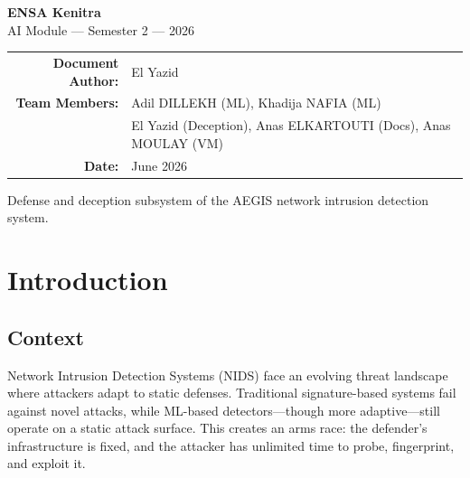 \documentclass[12pt,a4paper]{article}
\begin{document}
\begin{titlepage}
\centering
\vspace*{2cm}
\vspace{2cm}
{\large\textbf{ENSA Kenitra}\\[0.3cm]
{\large AI Module --- Semester 2 --- 2026}}
\vspace{1.5cm}
\begin{tabular}{rl}
\textbf{Document Author:} & El Yazid\\
\textbf{Team Members:} & Adil DILLEKH (ML), Khadija NAFIA (ML)\\
 & El Yazid (Deception), Anas ELKARTOUTI (Docs), Anas MOULAY (VM)\\
\textbf{Date:} & June 2026\\
\end{tabular}
\vfill
{\small\color{darkbg!40!black} Defense and deception subsystem of the AEGIS network intrusion detection system.}
\end{titlepage}

\tableofcontents
\newpage

\section{Introduction}
\label{sec:intro}

\subsection{Context}

Network Intrusion Detection Systems (NIDS) face an evolving threat landscape where attackers adapt to static defenses. Traditional signature-based systems fail against novel attacks, while ML-based detectors---though more adaptive---still operate on a static attack surface. This creates an arms race: the defender's infrastructure is fixed, and the attacker has unlimited time to probe, fingerprint, and exploit it.
\end{document}
